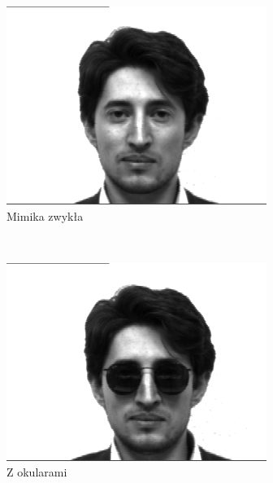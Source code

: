 \documentclass[a4paper,titlepage]{article}
\theoremstyle{break}
\numberwithin{equation}{subsection}
\begin{document}
\begin{figure}[H]
	\centering
	\begin{subfigure}[b]{0.3\textwidth}
		\includegraphics[width=\textwidth]{img/yale-faces/subject03-normal}
		\caption{Mimika zwykła}
	\end{subfigure}
	~ %
	\begin{subfigure}[b]{0.3\textwidth}
		\includegraphics[width=\textwidth]{img/yale-faces/subject03-glasses}
		\caption{Z okularami}
	\end{subfigure}
	\begin{subfigure}[b]{0.3\textwidth}

\end{subfigure}
\end{figure}
\end{document}
